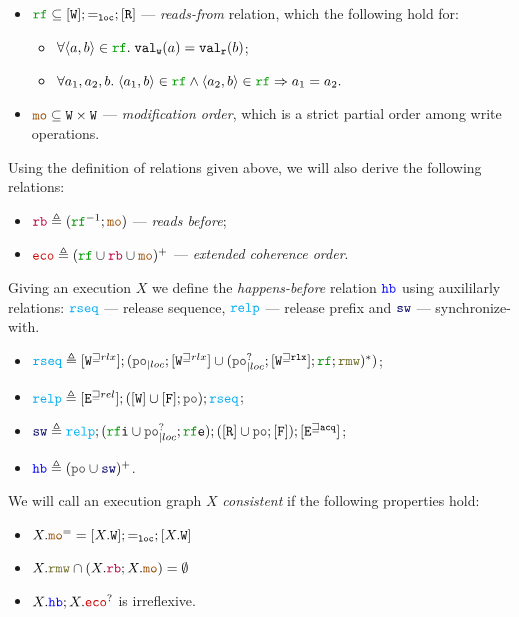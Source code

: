 \documentclass[12pt]{article}
\begin{document}
\begin{definition}
\begin{itemize}
    \item $\lRF \subseteq [\lW];=_{\lLOC};[\lR]$ --- \emph{reads-from} relation,
    which the following hold for:
    \begin{itemize}
      \item $\forall{\tup{a, b}} \in \lRF. \; \lVALW(a) = \lVALR(b)$;
      \item $\forall{a_1, a_2, b}. \;
        \tup{a_1, b} \in \lRF \wedge \tup{a_2, b} \in \lRF \Rightarrow a_1 = a_2.$
    \end{itemize}
    
    \item $\lMO \subseteq \lW \times \lW$ --- \emph{modification order},
    which is a strict partial order among write operations.

  \end{itemize}

  Using the definition of relations given above,
  we will also derive the following relations:
  \begin{itemize}
    \item $\lRB \defeq (\lRF^{-1};\lMO)$ --- \emph{reads before};
    \item $\lECO \defeq (\lRF \cup \lRB \cup \lMO)^+$ --- \emph{extended coherence order}.
  \end{itemize}

\end{definition}


\begin{definition}
  Giving an execution $X$ we define the \emph{happens-before} relation $\lHB$
  using auxililarly relations: 
  $\lRSEQ$ --- release sequence,
  $\lRELP$ --- release prefix and
  $\lSW$ --- synchronize-with.
  \begin{itemize}
  \item $\lRSEQ \defeq [\lWsqeq{rlx}];(\lmakeLoc{\lPO};[\lWsqeq{rlx}] \cup 
    (\lmakeLoc{\lPO^?};[\lWsqeq{\rlx}];\lRF;\lRMW)^*)$;
  \item $\lRELP \defeq [\lEsqeq{rel}];([\lW] \cup [\lF];\lPO);\lRSEQ$;
  \item $\lSW \defeq \lRELP; (\lRFI \cup \lmakeLoc{\lPO^?};\lRFE); ([\lR] \cup \lPO;[\lF]);[\lEsqeq{\acq}]$;
  \item $\lHB \defeq (\lPO \cup \lSW)^+$.
  \end{itemize}
\end{definition}

\begin{definition}
  We will call an execution graph $X$ \emph{consistent} if the following properties hold:
  \begin{itemize}
    \item $X.\lMO^= = [X.\lW];=_{\lLOC};[X.\lW]$
    \item $X.\lRMW \cap (X.\lRB;X.\lMO) = \emptyset$
    \item $X.\lHB;X.\lECO^?$ is irreflexive.
  \end{itemize}
\end{definition}
\end{document}
